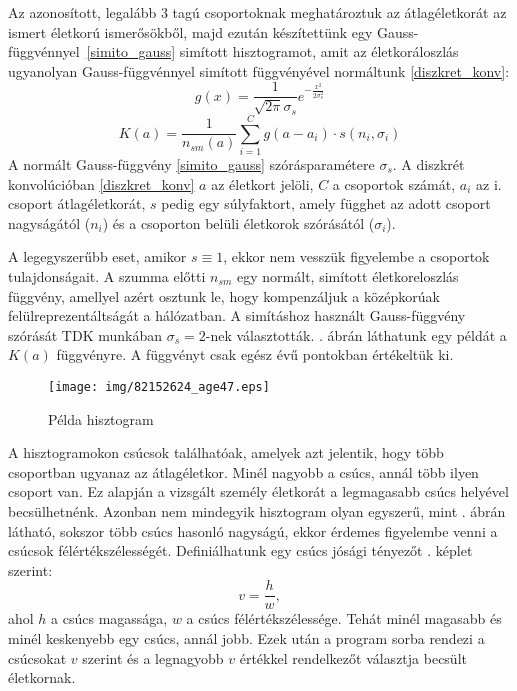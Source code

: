 \documentclass[12pt]{article}
\begin{document}
Az azonosított, legalább 3 %
tagú csoportoknak meghatároztuk az átlagéletkorát az ismert életkorú ismerősökből, majd ezután készítettünk egy \mbox{Gauss-függvénnyel \eqref{simito_gauss}} simított hisztogramot, %
amit az életkoráloszlás ugyanolyan Gauss-függvénnyel simított függvényével normáltunk \eqref{diszkret_konv}:
\begin{equation} \label{simito_gauss}
	g(x) = \frac{1}{\sqrt{2\pi}\sigma_s} e^{-\frac{x^2}{2\sigma_s^2}}
\end{equation}
\begin{equation} \label{diszkret_konv}
	K(a) = \frac{1}{n_{sm}(a)}\sum_{i=1}^{C} g(a-a_i) \cdot s(n_{i}, \sigma_{i}) %
\end{equation} %
A normált Gauss-függvény \eqref{simito_gauss} szórásparamétere $\sigma_s$. A diszkrét konvolúcióban \eqref{diszkret_konv} $a$ az életkort jelöli, $C$ a csoportok számát, $a_i$ az i. csoport átlagéletkorát, $s$ pedig egy súlyfaktort, amely függhet az adott csoport nagyságától ($n_{i}$) és a csoporton belüli életkorok szórásától ($\sigma_i$).

A legegyszerűbb eset, amikor $s\equiv 1$, ekkor nem vesszük figyelembe a csoportok tulajdonságait.
A szumma előtti $n_{sm}$ egy normált, simított életkoreloszlás függvény, amellyel azért osztunk le, hogy kompenzáljuk a középkorúak felülreprezentáltságát a hálózatban.
A simításhoz használt Gauss-függvény szórását  TDK munkában $\sigma_s=2$-nek választották. . ábrán láthatunk egy példát a $K(a)$ függvényre. A függvényt csak egész évű pontokban értékeltük ki.
\begin{figure}[H]
	\centering
	\texttt{[image: img/82152624\_age47.eps]}
	\caption{Példa hisztogram} %
	\label{hisztogram_pelda}
\end{figure}
A hisztogramokon csúcsok találhatóak, amelyek azt jelentik, hogy több csoportban ugyanaz az átlagéletkor. Minél nagyobb a csúcs, annál több ilyen csoport van. Ez alapján a vizsgált személy életkorát a legmagasabb csúcs helyével becsülhetnénk. Azonban nem mindegyik hisztogram olyan egyszerű, mint . ábrán látható, sokszor több csúcs hasonló nagyságú, ekkor érdemes figyelembe venni a csúcsok félértékszélességét. Definiálhatunk egy csúcs jósági tényezőt . képlet szerint:
\begin{equation} \label{csucs_josag}
	v = \frac{h}{w},
\end{equation}
ahol $h$ a csúcs magassága, $w$ a csúcs félértékszélessége. Tehát minél magasabb és minél keskenyebb egy csúcs, annál jobb. Ezek után a program sorba rendezi a csúcsokat $v$ szerint és a legnagyobb $v$ értékkel rendelkezőt választja becsült életkornak.
\end{document}
